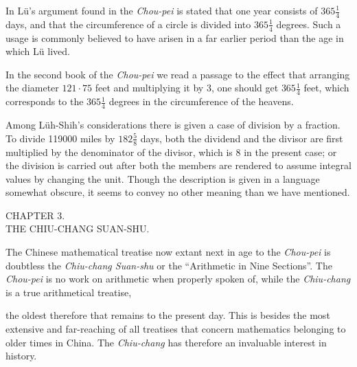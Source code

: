 \documentclass[11pt]{article}
\newcommand{\scanpage}[2]{\clearpage\setcounter{footnote}{0}\noindent{\footnotesize\color{gray}PDF page #1 · #2}\par\medskip}
\newcommand{\scanfooter}{}
\begin{document}
In Lü's argument found in the \emph{Chou-pei} is stated that one year consists of $365\frac14$ days, and that the circumference of a circle is divided into $365\frac14$ degrees. Such a usage is commonly believed to have arisen in a far earlier period than the age in which Lü lived.

In the second book of the \emph{Chou-pei} we read a passage to the effect that arranging the diameter $121\cdot 75$ feet and multiplying it by 3, one should get $365\frac14$ feet, which corresponds to the $365\frac14$ degrees in the circumference of the heavens.

Among Lüh-Shih's considerations there is given a case of division by a fraction. To divide 119000 miles by $182\frac58$ days, both the dividend and the divisor are first multiplied by the denominator of the divisor, which is 8 in the present case; or the division is carried out after both the members are rendered to assume integral values by changing the unit. Though the description is given in a language somewhat obscure, it seems to convey no other meaning than we have mentioned.

\begin{center}
CHAPTER 3.\\
THE CHIU-CHANG SUAN-SHU.
\end{center}

The Chinese mathematical treatise now extant next in age to the \emph{Chou-pei} is doubtless the \emph{Chiu-chang Suan-shu} or the ``Arithmetic in Nine Sections''. The \emph{Chou-pei} is no work on arithmetic when properly spoken of, while the \emph{Chiu-chang} is a true arithmetical treatise,
\scanfooter

\scanpage{0023}{Chapter 3, printed page 9}
\setcounter{footnote}{0}
the oldest therefore that remains to the present day. This is besides the most extensive and far-reaching of all treatises that concern mathematics belonging to older times in China. The \emph{Chiu-chang} has therefore an invaluable interest in history.
\end{document}
